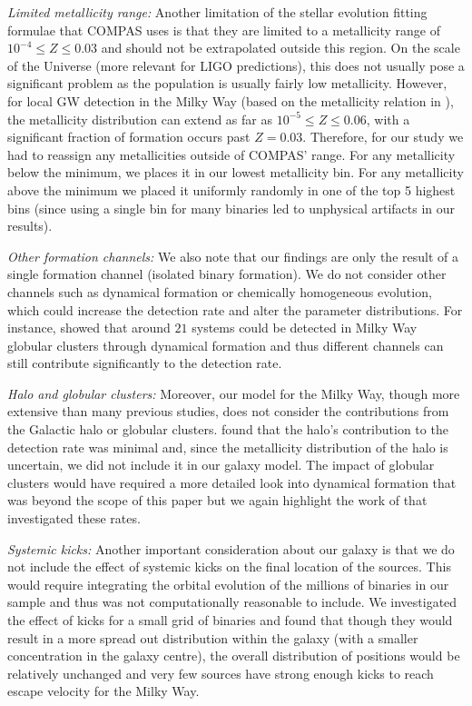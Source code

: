 \textit{Limited metallicity range:} Another limitation of the stellar evolution fitting formulae that COMPAS uses is that they are limited to a metallicity range of $10^{-4} \le Z \le 0.03$ and should not be extrapolated outside this region. On the scale of the Universe (more relevant for LIGO predictions), this does not usually pose a significant problem as the population is usually fairly low metallicity. However, for local GW detection in the Milky Way (based on the metallicity relation in \citet{Frankel+2018}), the metallicity distribution can extend as far as $10^{-5} \le Z \le 0.06$, with a significant fraction of formation occurs past $Z = 0.03$. Therefore, for our study we had to reassign any metallicities outside of COMPAS' range. For any metallicity below the minimum, we places it in our lowest metallicity bin. For any metallicity above the minimum we placed it uniformly randomly in one of the top 5 highest bins (since using a single bin for many binaries led to unphysical artifacts in our results).

\textit{Other formation channels:} We also note that our findings are only the result of a single formation channel (isolated binary formation). We do not consider other channels such as dynamical formation or chemically homogeneous evolution, which could increase the detection rate and alter the parameter distributions. For instance, \citet{Kremer+2018} showed that around $21$ systems could be detected in Milky Way globular clusters through dynamical formation and thus different channels can still contribute significantly to the detection rate.

\textit{Halo and globular clusters:} Moreover, our model for the Milky Way, though more extensive than many previous studies, does not consider the contributions from the Galactic halo or globular clusters. \citet{Lamberts+2018} found that the halo's contribution to the detection rate was minimal and, since the metallicity distribution of the halo is uncertain, we did not include it in our galaxy model. The impact of globular clusters would have required a more detailed look into dynamical formation that was beyond the scope of this paper but we again highlight the work of \citet{Kremer+2018} that investigated these rates.

\textit{Systemic kicks:} Another important consideration about our galaxy is that we do not include the effect of systemic kicks on the final location of the sources. This would require integrating the orbital evolution of the millions of binaries in our sample and thus was not computationally reasonable to include. We investigated the effect of kicks for a small grid of binaries and found that though they would result in a more spread out distribution within the galaxy (with a smaller concentration in the galaxy centre), the overall distribution of positions would be relatively unchanged and very few sources have strong enough kicks to reach escape velocity for the Milky Way.

